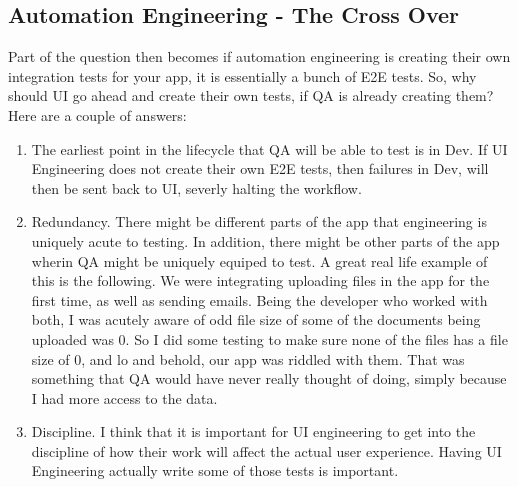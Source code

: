 \subsection{ Automation Engineering - The Cross Over }
Part of the question then becomes if automation engineering is creating their
own integration tests for your app, it is essentially a bunch of E2E tests. So,
why should UI go ahead and create their own tests, if QA is already creating
them? Here are a couple of answers:
\begin{enumerate}
  \item The earliest point in the lifecycle that QA will be able to test is in
  Dev. If UI Engineering does not create their own E2E tests, then failures in
  Dev, will then be sent back to UI, severly halting the workflow.
  \item Redundancy. There might be different parts of the app that engineering
  is uniquely acute to testing. In addition, there might be other parts of the
  app wherin QA might be uniquely equiped to test. A great real life example of
  this is the following. We were integrating uploading files in the app for the
  first time, as well as sending emails. Being the developer who worked with
  both, I was acutely aware of odd file size of some of the documents being
  uploaded was 0. So I did some testing to make sure none of the files has a
  file size of 0, and lo and behold, our app was riddled with them. That was
  something that QA would have never really thought of doing, simply because I
  had more access to the data.
  \item Discipline. I think that it is important for UI engineering to get into
  the discipline of how their work will affect the actual user experience.
  Having UI Engineering actually write some of those tests is important.

\end{enumerate}
